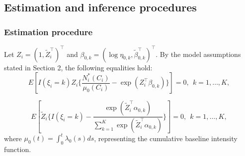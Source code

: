 \hypertarget{estimation-and-inference-procedures}{%
\subsection{Estimation and inference procedures}\label{estimation-and-inference-procedures}}

\hypertarget{estimation-procedure}{%
\subsubsection{Estimation procedure}\label{estimation-procedure}}

Let \(Z_i = (1, \tilde{Z}_{i}^{\top})^{\top}\) and \(\beta _{0,k} = (\log{\eta_{0,k}}, \tilde{\beta}_{0,k} ^{\top})^{\top}\). By the model assumptions stated in Section 2, the following equalities hold:
\begin{equation} 
\label{eq:3}
E[ I(\xi _{i} = k) Z_{i} \{ \frac{N_{i} ^{*} (C _{i})}{\mu_{0} (C_{i})}  - \exp(Z_{i} ^{\top} \beta _{0,k}) \}] = 0,\ \ k=1,\ldots, K, 
\end{equation}

\begin{equation} 
\label{eq:4}
E[\tilde Z_i\{ I(\xi_i=k)-\frac{\exp(\tilde{Z} _{i} ^{\top} \alpha _{0,k})}{\sum_{k = 1}^{K}\exp(\tilde{Z} _{i} ^{\top} \alpha _{0,k}) } \}]= 0,\ \ k=1,\ldots, K,
\end{equation}
where \(\mu_0(t)=\int_0^t \lambda_0(s)ds\), representing the cumulative baseline intensity function.

